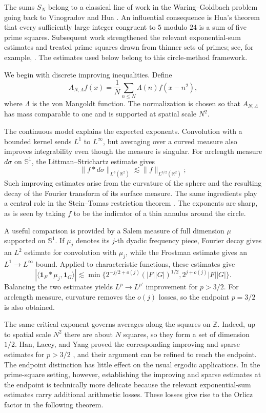 \documentclass[12pt,reqno]{amsart}
\numberwithin{equation}{section}
\theoremstyle{definition}
\theoremstyle{remark}
\begin{document}
\medskip



The sums \(S_N\) belong to a classical line of work in the
Waring--Goldbach problem going back to Vinogradov and Hua
\cite{Vinogradov,Hua}.  An influential  consequence is Hua's theorem that
every sufficiently large integer congruent to \(5\) modulo \(24\) is a
sum of five prime squares.  Subsequent work strengthened the relevant
exponential-sum estimates and treated prime squares drawn from thinner
sets of primes; see, for example,
\cite{Xiumin2005,B2016,GLZ22,SDP19}.  The estimates used below belong to
this circle-method framework.

\bigskip

We begin with discrete improving inequalities.  Define
\[
 A_{N,\Lambda}f(x)
 =\frac1N\sum_{n\leq N}\Lambda(n)f(x-n^2),
\]
where $\Lambda$ is the von Mangoldt function.  The normalization is
chosen so that $A_{N,\Lambda}$ has mass comparable to one and is
supported at spatial scale $N^2$.

The continuous model explains the expected exponents.  Convolution with
a bounded kernel sends $L^1$ to $L^\infty$, but averaging over a curved
measure also improves integrability even though the measure is
singular.  For arclength measure $d\sigma$ on $\mathbb S^1$, the
Littman--Strichartz estimate gives
\[
 \|f*d\sigma\|_{L^3(\mathbb R^2)}
 \lesssim \|f\|_{L^{3/2}(\mathbb R^2)};
\]
Such improving estimates arise from the curvature of the sphere and
the resulting decay of the Fourier transform of its surface measure.
The same ingredients play a central role in the Stein--Tomas restriction
theorem \cite{Littman,Strichartz,Tomas}.
  The exponents are sharp, as is seen by
taking $f$ to be the indicator of a thin annulus around the circle.


A useful comparison is provided by a Salem measure of full dimension
$\mu$ supported on $\mathbb S^1$.  If $\mu_j$ denotes its \(j\)-th
dyadic frequency piece, Fourier decay gives an \(L^2\) estimate for
convolution with $\mu_j$, while the Frostman estimate gives an
\(L^1\to L^\infty\) bound.  Applied to characteristic functions, these
estimates give
\[
 |\langle \mathbf1_F*\mu_j,\mathbf1_G\rangle|
 \lesssim
 \min\bigl\{2^{-j/2+o(j)}(|F||G|)^{1/2},
             2^{j+o(j)}|F||G|\bigr\}.
\]
Balancing the two estimates yields \(L^p\to L^{p'}\) improvement for
\(p>3/2\).  For arclength measure, curvature removes the \(o(j)\) losses,
so the endpoint \(p=3/2\) is also obtained. 


The same critical exponent governs averages along the squares on
\(\mathbb Z\).  Indeed, up to spatial scale \(N^2\) there are about
\(N\) squares, so they form a set of dimension \(1/2\).  Han, Lacey,
and Yang proved the corresponding improving and sparse estimates for
\(p>3/2\) \cite{LHF}, and their argument can be refined to reach the
endpoint.  The endpoint distinction has little effect on the usual
ergodic applications.  In the
prime-square setting, however, establishing the improving and sparse estimates
at the endpoint is technically more delicate because the relevant
exponential-sum estimates carry additional arithmetic losses.  These
losses give rise to the Orlicz factor in the following theorem.
\end{document}
